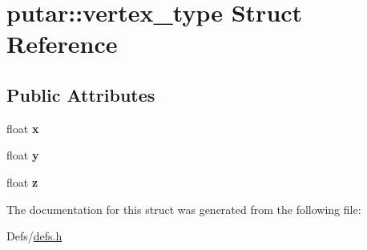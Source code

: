 \hypertarget{structputar_1_1vertex__type}{}\section{putar\+:\+:vertex\+\_\+type Struct Reference}
\label{structputar_1_1vertex__type}
\subsection*{Public Attributes}
\begin{DoxyCompactItemize}
\item 
float {\bfseries x}\hypertarget{structputar_1_1vertex__type_a552b7fb64487621f35436eb70981e1b7}{}\label{structputar_1_1vertex__type_a552b7fb64487621f35436eb70981e1b7}

\item 
float {\bfseries y}\hypertarget{structputar_1_1vertex__type_a798b0972222fb9a6c69a6d32b1adee8c}{}\label{structputar_1_1vertex__type_a798b0972222fb9a6c69a6d32b1adee8c}

\item 
float {\bfseries z}\hypertarget{structputar_1_1vertex__type_a04b2f453fb5b6f9f9d987a1bd3c9f36d}{}\label{structputar_1_1vertex__type_a04b2f453fb5b6f9f9d987a1bd3c9f36d}

\end{DoxyCompactItemize}


The documentation for this struct was generated from the following file\+:\begin{DoxyCompactItemize}
\item 
Defs/\hyperlink{defs_8h}{defs.\+h}\end{DoxyCompactItemize}
